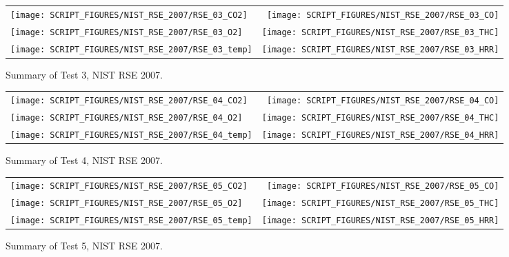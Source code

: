 \begin{figure}[p]
\begin{tabular*}{\textwidth}{l@{\extracolsep{\fill}}r}
\texttt{[image: SCRIPT\_FIGURES/NIST\_RSE\_2007/RSE\_03\_CO2]} &
\texttt{[image: SCRIPT\_FIGURES/NIST\_RSE\_2007/RSE\_03\_CO]} \\
\texttt{[image: SCRIPT\_FIGURES/NIST\_RSE\_2007/RSE\_03\_O2]} &
\texttt{[image: SCRIPT\_FIGURES/NIST\_RSE\_2007/RSE\_03\_THC]} \\
\texttt{[image: SCRIPT\_FIGURES/NIST\_RSE\_2007/RSE\_03\_temp]} &
\texttt{[image: SCRIPT\_FIGURES/NIST\_RSE\_2007/RSE\_03\_HRR]}
\end{tabular*}
\caption[Summary of Test 3, NIST RSE 2007]{Summary of Test 3, NIST RSE 2007.}
\label{NIST_RSE_2007_3}
\end{figure}

\begin{figure}[p]
\begin{tabular*}{\textwidth}{l@{\extracolsep{\fill}}r}
\texttt{[image: SCRIPT\_FIGURES/NIST\_RSE\_2007/RSE\_04\_CO2]} &
\texttt{[image: SCRIPT\_FIGURES/NIST\_RSE\_2007/RSE\_04\_CO]} \\
\texttt{[image: SCRIPT\_FIGURES/NIST\_RSE\_2007/RSE\_04\_O2]} &
\texttt{[image: SCRIPT\_FIGURES/NIST\_RSE\_2007/RSE\_04\_THC]} \\
\texttt{[image: SCRIPT\_FIGURES/NIST\_RSE\_2007/RSE\_04\_temp]} &
\texttt{[image: SCRIPT\_FIGURES/NIST\_RSE\_2007/RSE\_04\_HRR]}
\end{tabular*}
\caption[Summary of Test 4, NIST RSE 2007]{Summary of Test 4, NIST RSE 2007.}
\label{NIST_RSE_2007_4}
\end{figure}

\begin{figure}[p]
\begin{tabular*}{\textwidth}{l@{\extracolsep{\fill}}r}
\texttt{[image: SCRIPT\_FIGURES/NIST\_RSE\_2007/RSE\_05\_CO2]} &
\texttt{[image: SCRIPT\_FIGURES/NIST\_RSE\_2007/RSE\_05\_CO]} \\
\texttt{[image: SCRIPT\_FIGURES/NIST\_RSE\_2007/RSE\_05\_O2]} &
\texttt{[image: SCRIPT\_FIGURES/NIST\_RSE\_2007/RSE\_05\_THC]} \\
\texttt{[image: SCRIPT\_FIGURES/NIST\_RSE\_2007/RSE\_05\_temp]} &
\texttt{[image: SCRIPT\_FIGURES/NIST\_RSE\_2007/RSE\_05\_HRR]}
\end{tabular*}
\caption[Summary of Test 5, NIST RSE 2007]{Summary of Test 5, NIST RSE 2007.}
\label{NIST_RSE_2007_5}
\end{figure}


